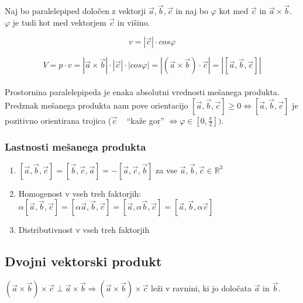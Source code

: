 \documentclass[a4paper,12pt]{article}
\begin{document}
Naj bo paralelepiped določen z vektorji $\vec{a}, \vec{b}, \vec{c}$ in naj bo $\varphi$ kot med $\vec{c}$ in $\vec{a} \times \vec{b}$. $\varphi$ je tudi kot med vektorjem $\vec{c}$ in višino. 

$$ v = |\vec{c}| \cdot cos\varphi $$

$$ V = p \cdot v = |\vec{a} \times \vec{b}| \cdot |\vec{c}| \cdot |cos\varphi| = | ( \vec{a} \times \vec{b}) \cdot \vec{c}| = | [ \vec{a}, \vec{b}, \vec{c}]| $$ \\

Prostornina paralelepipeda je enaka absolutni vrednosti mešanega produkta. Predznak mešanega produkta nam pove orientacijo $[ \vec{a}, \vec{b}, \vec{c}]\geq 0 \Leftrightarrow [ \vec{a}, \vec{b}, \vec{c}] $ je pozitivno orientirana trojica ($\vec{c}$ ~ ``kaže gor'' $ \Leftrightarrow \varphi \in [0, \frac{\pi}{2}])$. \\

\newpage

\begin{center}
\subsubsection{Lastnosti mešanega produkta}
\end{center}

\begin{enumerate}
\item $[ \vec{a}, \vec{b}, \vec{c}] = [ \vec{b},\vec{c},\vec{a}] = - [ \vec{a}, \vec{c},\vec{b} ] $ za vse $\vec{a}, \vec{b}, \vec{c} \in \mathbb{R}^3$
\item Homogenost v vseh treh faktorjih: $\alpha [ \vec{a}, \vec{b}, \vec{c}] = [ \alpha \vec{a}, \vec{b}, \vec{c}] = [ \vec{a}, \alpha \vec{b}, \vec{c}] = [ \vec{a}, \vec{b}, \alpha \vec{c}] $
\item Distributivnost v vseh treh faktorjih
\end{enumerate}

\newpage

\begin{center}
\subsection{Dvojni vektorski produkt}
\end{center}

$ (\vec{a}\times\vec{b})\times \vec{c} \perp \vec{a} \times \vec{b} \Rightarrow (\vec{a}\times \vec{b})\times\vec{c}$ leži v ravnini, ki jo določata $\vec{a}$ in $\vec{b}$. \\
\end{document}
